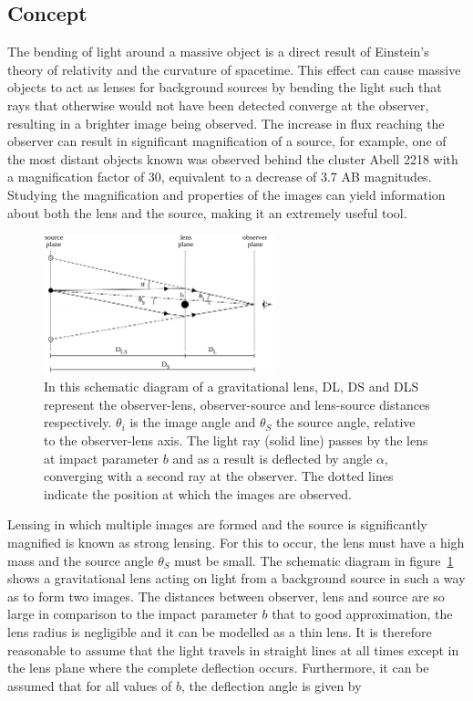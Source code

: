     \subsection{Concept} %
    \label{sub:concept}
        The bending of light around a massive object is a direct result of Einstein’s theory of relativity and the curvature of spacetime. This effect can cause massive objects to act as lenses for background sources by bending the light such that rays that otherwise would not have been detected converge at the observer, resulting in a brighter image being observed. The increase in flux reaching the observer can result in significant magnification of a source, for example, one of the most distant objects known was observed behind the cluster Abell 2218 with a magnification factor of 30, equivalent to a decrease of 3.7 AB magnitudes\cite{Distant_object_Abell2218}. Studying the magnification and properties of the images can yield information about both the lens and the source, making it an extremely useful tool\cite{Hartle}.
        \begin{figure}[ht]
            \centering
                \includegraphics[width=0.6\textwidth]{../Images/Lensing_light_bending.png}
            \caption[Diagram of a gravitational lens]{In this schematic diagram of a gravitational lens, DL, DS and DLS represent the observer-lens, observer-source and lens-source distances respectively. $\theta_i$ is the image angle and $\theta_S$ the source angle, relative to the observer-lens axis. The light ray (solid line) passes by the lens at impact parameter $b$ and as a result is deflected by angle $\alpha$, converging with a second ray at the observer. The dotted lines indicate the position at which the images are observed\cite{Lensing_light_bending_diagram}.\label{fig:Lensing_light_bending}}
        \end{figure}
        Lensing in which multiple images are formed and the source is significantly magnified is known as strong lensing. For this to occur, the lens must have a high mass and the source angle $\theta_S$ must be small. The schematic diagram in figure~\ref{fig:Lensing_light_bending} shows a gravitational lens acting on light from a background source in such a way as to form two images. The distances between observer, lens and source are so large in comparison to the impact parameter $b$ that to good approximation, the lens radius is negligible and it can be modelled as a thin lens. It is therefore reasonable to assume that the light travels in straight lines at all times except in the lens plane where the complete deflection occurs. Furthermore, it can be assumed that for all values of $b$, the deflection angle is given by
